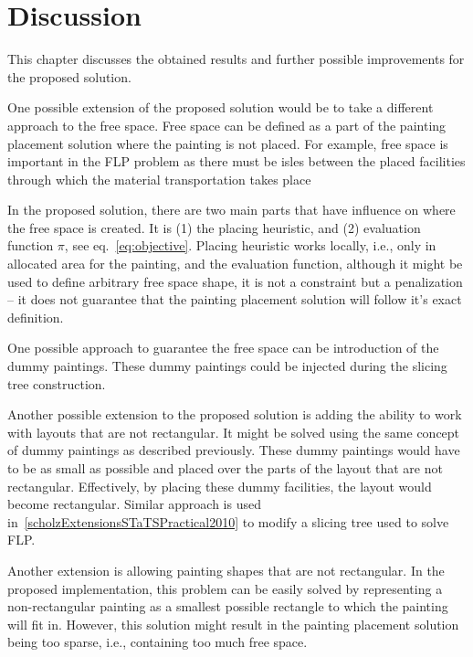 \chapter{Discussion}\label{ch:discussion}

This chapter discusses the obtained results and further possible improvements for the proposed solution.


One possible extension of the proposed solution would be to take a different approach to the free space.
Free space can be defined as a part of the painting placement solution where the painting is not placed.
For example, free space is important in the FLP problem as there must be isles between the placed facilities
through which the material transportation takes place

In the proposed solution, there are two main parts that have influence on where the free space is created.
It is (1) the placing heuristic, and (2) evaluation function $\pi$, see eq.~\ref{eq:objective}.
Placing heuristic works locally, i.e., only in allocated area for the painting, and the evaluation
function, although it might be used to define arbitrary free space shape, it is not a constraint
but a penalization – it does not guarantee that the painting placement solution will follow
it's exact definition.

One possible approach to guarantee the free space can be introduction of the dummy paintings.
These dummy paintings could be injected during the slicing tree construction.


Another possible extension to the proposed solution is adding the ability to work
with layouts that are not rectangular.
It might be solved using the same concept of dummy paintings as described previously.
These dummy paintings would have to be as small as possible and placed over the
parts of the layout that are not rectangular.
Effectively, by placing these dummy facilities, the layout would become rectangular.
Similar approach is used in~\ref{scholzExtensionsSTaTSPractical2010} to modify a slicing tree used to solve FLP.


Another extension is allowing painting shapes that are not rectangular.
In the proposed implementation, this problem can be easily solved by representing
a non-rectangular painting as a smallest possible rectangle to which the painting will fit in.
However, this solution might result in the painting placement solution being too sparse,
i.e., containing too much free space.

